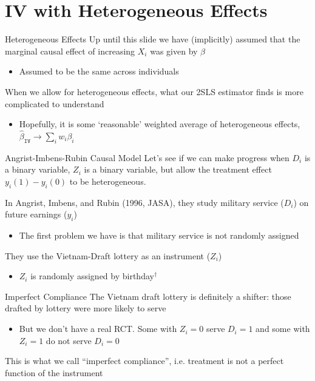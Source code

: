 \documentclass[aspectratio=169,t,11pt,table]{beamer}
\begin{document}
\section{IV with Heterogeneous Effects}
\begin{frame}{Heterogeneous Effects}
  Up until this slide we have (implicitly) assumed that the marginal causal effect of increasing $X_i$ was given by $\beta$ 
  \begin{itemize}
    \item Assumed to be the same across individuals
  \end{itemize}

  \bigskip
  When we allow for heterogeneous effects, what our 2SLS estimator finds is more complicated to understand
  \begin{itemize}
    \item Hopefully, it is some `reasonable' weighted average of heterogeneous effects, $\hat{\beta}_{\texttt{IV}} \to \sum_i w_i \beta_i$
  \end{itemize}
\end{frame}

\begin{frame}{Angrist-Imbens-Rubin Causal Model}
  Let's see if we can make progress when $D_i$ is a binary variable, $Z_i$ is a binary variable, but allow the treatment effect $y_i(1) - y_i(0)$ to be heterogeneous.

  \bigskip 
  In Angrist, Imbens, and Rubin (1996, JASA), they study military service ($D_i$) on future earnings ($y_i$)
  \begin{itemize}
    \item The first problem we have is that military service is not randomly assigned
  \end{itemize} 
  
  \pause
  \bigskip
  They use the Vietnam-Draft lottery as an instrument ($Z_i$)
  \begin{itemize}
    \item $Z_i$ is randomly assigned by birthday$^\dagger$
  \end{itemize}

\end{frame}

\begin{frame}{Imperfect Compliance}
  The Vietnam draft lottery is definitely a shifter: those drafted by lottery were more likely to serve
  \begin{itemize}
    \item But we don't have a real RCT. Some with $Z_i = 0$ serve $D_i = 1$ and some with $Z_i = 1$ do not serve $D_i = 0$
  \end{itemize}

  \bigskip
  \pause
  This is what we call ``imperfect compliance'', i.e. treatment is not a perfect function of the instrument
\end{frame}
\end{document}
